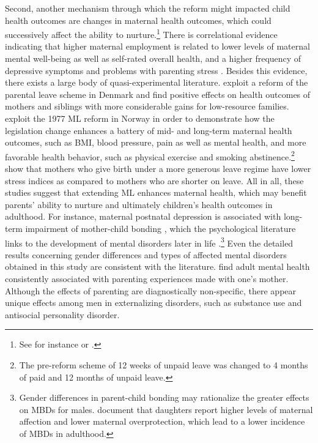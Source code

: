 Second, another mechanism through which the reform might impacted child health outcomes are changes in maternal health outcomes, which could successively affect the ability to nurture.\footnote{See for instance \cite{patel2004} or \cite{frech2011maternal}.} There is correlational evidence indicating that higher maternal employment is related to lower levels of maternal mental well-being as well as self-rated overall health, and a higher frequency of depressive symptoms and problems with parenting stress \citep{chatterji2005does,Chatterji2013}. Besides this evidence, there exists a large body of quasi-experimental literature. \cite{beuchert2016} exploit a reform of the parental leave scheme in Denmark and find positive effects on health outcomes of mothers and siblings with more considerable gains for low-resource families. \cite{butikofer2018impact} exploit the 1977 ML reform in Norway in order to demonstrate how the legislation change enhances a battery of mid- and long-term maternal health outcomes, such as BMI, blood pressure, pain as well as mental health, and more favorable health behavior, such as physical exercise and smoking abstinence.\footnote{The pre-reform scheme of 12 weeks of unpaid leave was changed to 4 months of paid and 12 months of unpaid leave.} \cite{albagli2018} show that mothers who give birth under a more generous leave regime have lower stress indices as compared to mothers who are shorter on leave. All in all, these studies suggest that extending ML enhances maternal health, which may benefit parents' ability to nurture and ultimately children's health outcomes in adulthood. For instance, maternal postnatal depression is associated with long-term impairment of mother-child bonding \citep{tronick2009}, which the psychological literature links to the development of mental disorders later in life \citep{canetti1997parental}.\footnote{Gender differences in parent-child bonding may rationalize the greater effects on MBDs for males. \cite{murphy2010} document that daughters report higher levels of maternal affection and lower maternal overprotection, which lead to a lower incidence of MBDs in adulthood.} Even the detailed results concerning gender differences and types of affected mental disorders obtained in this study are consistent with the literature. \cite{enns_cox_clara_2002} find adult mental health consistently associated with parenting experiences made with one's mother. Although the effects of parenting are diagnostically non-specific, there appear unique effects among men in externalizing disorders, such as substance use and antisocial personality disorder.




